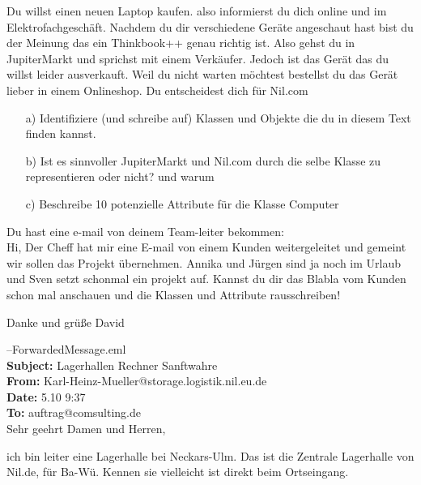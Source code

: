 


        \subexcercise Du willst einen neuen Laptop kaufen. also informierst du dich online und im Elektrofachgeschäft. Nachdem du dir verschiedene Geräte angeschaut hast bist du der Meinung das ein Thinkbook++ genau richtig ist. Also gehst du in JupiterMarkt und sprichst mit einem Verkäufer. Jedoch ist das Gerät das du willst leider ausverkauft. Weil du nicht warten möchtest bestellst du das Gerät lieber in einem Onlineshop. Du entscheidest dich für Nil.com

        \begin{enumerate}
         \item[a)] Identifiziere (und schreibe auf) Klassen und Objekte die du in diesem Text finden kannst.
         \item[b)] Ist es sinnvoller JupiterMarkt und Nil.com durch die selbe Klasse zu representieren oder nicht? und warum
         \item[c)] Beschreibe 10 potenzielle Attribute für die Klasse Computer
        \end{enumerate}
        \subexcercise Du hast eine e-mail von deinem Team-leiter bekommen:\\

        Hi,
        Der Cheff hat mir eine E-mail von einem Kunden weitergeleitet und gemeint wir sollen das Projekt übernehmen. Annika und Jürgen sind ja noch im Urlaub und Sven setzt schonmal ein projekt auf. Kannst du dir das Blabla vom Kunden schon mal anschauen und die Klassen und Attribute rausschreiben!

        Danke und grüße
        David

        --ForwardedMessage.eml\\
        \textbf{Subject:} Lagerhallen Rechner Sanftwahre\\
        \textbf{From:} Karl-Heinz-Mueller@storage.logistik.nil.eu.de\\
        \textbf{Date:} 5.10 9:37\\
        \textbf{To:} auftrag@comsulting.de\\

        Sehr geehrt Damen und Herren,\medskip

        ich bin leiter eine Lagerhalle bei Neckars-Ulm. Das ist die Zentrale Lagerhalle von Nil.de, für Ba-Wü. Kennen sie vielleicht ist direkt beim Ortseingang.

